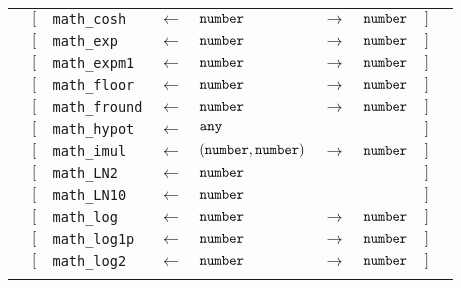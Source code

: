 \begin{tabular}[fragile]{lllllllll}
& $[$ & \texttt{math\_cosh} & $\leftarrow$  & $\texttt{number}$ & $\rightarrow$ & $\texttt{number}$ & $]$ \\
& $[$ & \texttt{math\_exp} & $\leftarrow$  & $\texttt{number}$ & $\rightarrow$ & $\texttt{number}$ & $]$ \\
& $[$ & \texttt{math\_expm1} & $\leftarrow$  & $\texttt{number}$ & $\rightarrow$ & $\texttt{number}$ & $]$ \\
& $[$ & \texttt{math\_floor} & $\leftarrow$  & $\texttt{number}$ & $\rightarrow$ & $\texttt{number}$ & $]$ \\
& $[$ & \texttt{math\_fround} & $\leftarrow$  & $\texttt{number}$ & $\rightarrow$ & $\texttt{number}$ & $]$ \\
& $[$ & \texttt{math\_hypot} & $\leftarrow$  & $\texttt{any}$ & & & $]$ \\
& $[$ & \texttt{math\_imul} & $\leftarrow$  & $(\texttt{number}, \texttt{number})$ & $\rightarrow$ & $\texttt{number}$ & $]$ \\
& $[$ & \texttt{math\_LN2} & $\leftarrow$  & $\texttt{number}$ & & & $]$ \\
& $[$ & \texttt{math\_LN10} & $\leftarrow$  & $\texttt{number}$ & & & $]$ \\
& $[$ & \texttt{math\_log} & $\leftarrow$  & $\texttt{number}$ & $\rightarrow$ & $\texttt{number}$ & $]$ \\
& $[$ & \texttt{math\_log1p} & $\leftarrow$  & $\texttt{number}$ & $\rightarrow$ & $\texttt{number}$ & $]$ \\
& $[$ & \texttt{math\_log2} & $\leftarrow$  & $\texttt{number}$ & $\rightarrow$ & $\texttt{number}$ & $]$ \\
& \end{tabular}

